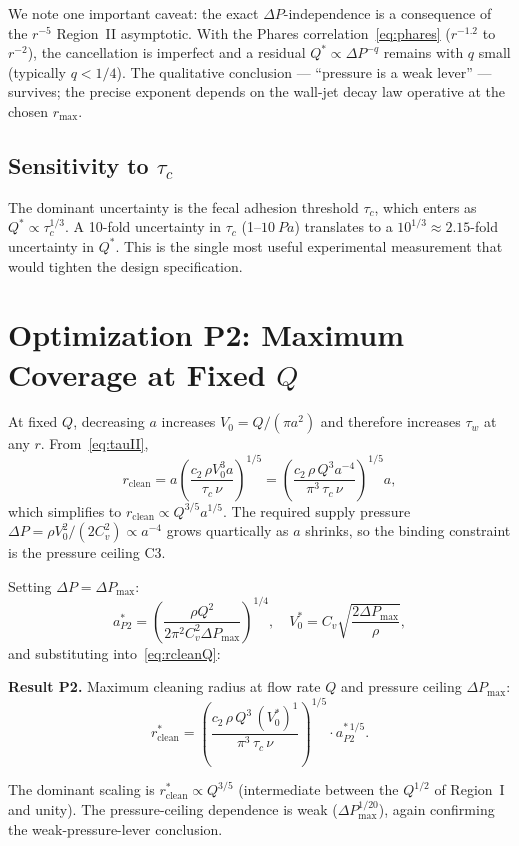 \documentclass[aps,prfluids,reprint,amsmath,amssymb,floatfix]{revtex4-2}
\begin{document}
We note one important caveat: the exact $\Delta P$-independence is a
consequence of the $r^{-5}$ Region~II asymptotic. With the Phares
correlation~\eqref{eq:phares} ($r^{-1.2}$ to $r^{-2}$), the cancellation
is imperfect and a residual $Q^* \propto \Delta P^{-q}$ remains with
$q$ small (typically $q < 1/4$). The qualitative conclusion ---
``pressure is a weak lever'' --- survives; the precise exponent depends
on the wall-jet decay law operative at the chosen $r_\mathrm{max}$.

\subsection{Sensitivity to $\tau_c$}

The dominant uncertainty is the fecal adhesion threshold $\tau_c$, which
enters as $Q^* \propto \tau_c^{1/3}$. A 10-fold uncertainty in $\tau_c$
(1--$\SI{10}{Pa}$) translates to a $10^{1/3} \approx 2.15$-fold uncertainty
in $Q^*$. This is the single most useful experimental measurement that
would tighten the design specification.

\section{Optimization P2: Maximum Coverage at Fixed $Q$}
\label{sec:P2}

At fixed $Q$, decreasing $a$ increases $V_0 = Q/(\pi a^2)$ and therefore
increases $\tau_w$ at any $r$. From~\eqref{eq:tauII},
\begin{equation}
  r_\mathrm{clean} = a\left(\frac{c_2\,\rho V_0^3 a}{\tau_c\,\nu}\right)^{1/5}
  = \left(\frac{c_2\,\rho\,Q^3 a^{-4}}{\pi^3\,\tau_c\,\nu}\right)^{1/5} a,
  \label{eq:rcleanQ}
\end{equation}
which simplifies to $r_\mathrm{clean} \propto Q^{3/5} a^{1/5}$. The
required supply pressure $\Delta P = \rho V_0^2/(2 C_v^2) \propto a^{-4}$
grows quartically as $a$ shrinks, so the binding constraint is the
pressure ceiling C3.

Setting $\Delta P = \Delta P_\mathrm{max}$:
\begin{equation}
  a^*_{P2} = \left(\frac{\rho Q^2}{2\pi^2 C_v^2 \Delta P_\mathrm{max}}\right)^{1/4},
  \quad V_0^* = C_v\sqrt{\frac{2\Delta P_\mathrm{max}}{\rho}},
  \label{eq:aP2}
\end{equation}
and substituting into~\eqref{eq:rcleanQ}:
\begin{mdframed}[style=resultbox]
\textbf{Result P2.} Maximum cleaning radius at flow rate $Q$ and
pressure ceiling $\Delta P_\mathrm{max}$:
\begin{equation}
  r^*_\mathrm{clean}
  = \left(\frac{c_2\,\rho\,Q^3\,(V_0^*)^{1}}{\pi^3\,\tau_c\,\nu}\right)^{1/5}
  \cdot a^{*\,1/5}_{P2}.
  \label{eq:rstar}
\end{equation}
\end{mdframed}
The dominant scaling is $r^*_\mathrm{clean} \propto Q^{3/5}$ (intermediate
between the $Q^{1/2}$ of Region~I and unity). The pressure-ceiling
dependence is weak ($\Delta P_\mathrm{max}^{1/20}$), again confirming
the weak-pressure-lever conclusion.
\end{document}
